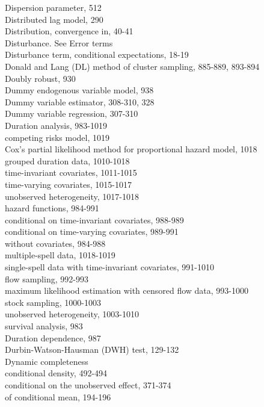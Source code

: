\documentclass[10pt]{article}
\begin{document}
Dispersion parameter, 512\\
Distributed lag model, 290\\
Distribution, convergence in, 40-41\\
Disturbance. See Error terms\\
Disturbance term, conditional expectations, 18-19\\
Donald and Lang (DL) method of cluster sampling, 885-889, 893-894\\
Doubly robust, 930\\
Dummy endogenous variable model, 938\\
Dummy variable estimator, 308-310, 328\\
Dummy variable regression, 307-310\\
Duration analysis, 983-1019\\
competing risks model, 1019\\
Cox's partial likelihood method for proportional hazard model, 1018\\
grouped duration data, 1010-1018\\
time-invariant covariates, 1011-1015\\
time-varying covariates, 1015-1017\\
unobserved heterogeneity, 1017-1018\\
hazard functions, 984-991\\
conditional on time-invariant covariates, 988-989\\
conditional on time-varying covariates, 989-991\\
without covariates, 984-988\\
multiple-spell data, 1018-1019\\
single-spell data with time-invariant covariates, 991-1010\\
flow sampling, 992-993\\
maximum likelihood estimation with censored flow data, 993-1000\\
stock sampling, 1000-1003\\
unobserved heterogeneity, 1003-1010\\
survival analysis, 983\\
Duration dependence, 987\\
Durbin-Watson-Hausman (DWH) test, 129-132\\
Dynamic completeness\\
conditional density, 492-494\\
conditional on the unobserved effect, 371-374\\
of conditional mean, 194-196\\
\end{document}
